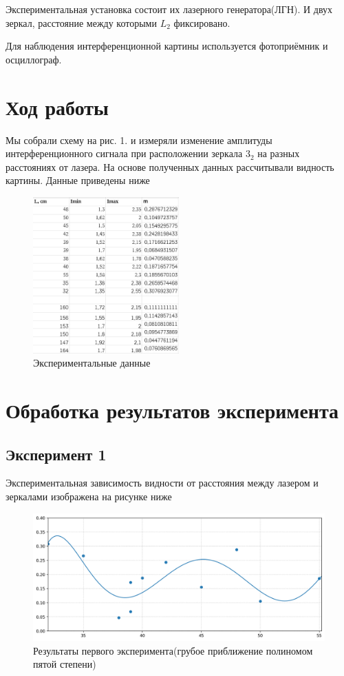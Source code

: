 \documentclass{article}
\begin{document}
Экспериментальная установка состоит их лазерного генератора(ЛГН).
И двух зеркал, расстояние между которыми $L_{2}$ фиксировано.

Для наблюдения интерференционной картины используется фотоприёмник и
осциллограф.

\section{Ход работы}
Мы собрали схему на рис. 1. и измеряли изменение амплитуды интерференционного сигнала при расположении зеркала \(3_2\) на разных расстояниях от лазера.
На основе полученных данных рассчитывали видность картины. Данные приведены ниже
\begin{figure}[htp]
	\centering
	\includegraphics[width=0.5\textwidth]{dermo.jpg}
	\caption{Экспериментальные данные}
	\label{pic:experimental_data}
\end{figure}
\section{Обработка результатов эксперимента}

\subsection{Эксперимент 1}

Экспериментальная зависимость видности от расстояния между лазером и зеркалами
изображена на рисунке ниже
\begin{figure}[htbp]
	\centering
	\includegraphics[width = 0.7 \textwidth]{data_1.png}
	\caption{Результаты первого эксперимента(грубое приближение полиномом пятой степени)}
	\label{pic:exp_1}
\end{figure}
\end{document}

